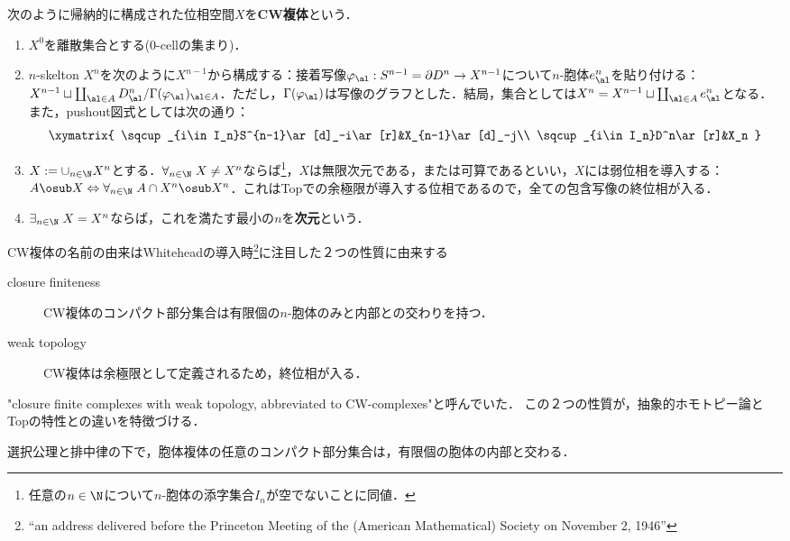 \documentclass[uplatex, dvipdfmx]{jsreport}
\begin{document}
\begin{definition}
    次のように帰納的に構成された位相空間$X$を\textbf{CW複体}という．
    \begin{enumerate}
        \item $X^0$を離散集合とする($0$-cellの集まり)．
        \item $n$-skelton $X^n$を次のように$X^{n-1}$から構成する：接着写像$\varphi_\al:S^{n-1}=\partial D^n\to X^{n-1}$について$n$-胞体$e^n_\al$を貼り付ける：$X^{n-1}\sqcup\coprod_{\al\in A}D^n_\al/\Gamma(\varphi_\al)_{\al\in A}$．ただし，$\Gamma(\varphi_\al)$は写像のグラフとした．結局，集合としては$X^{n}=X^{n-1}\sqcup\coprod_{\al\in A}e^n_\al$となる．
        また，pushout図式としては次の通り：
        \[\xymatrix{
        \sqcup_{i\in I_n}S^{n-1}\ar[d]_-i\ar[r]&X_{n-1}\ar[d]_-j\\
        \sqcup_{i\in I_n}D^n\ar[r]&X_n
        }\]
        \item $X:=\cup_{n\in\N}X^n$とする．$\forall_{n\in\N}\;X\ne X^n$ならば\footnote{任意の$n\in\N$について$n$-胞体の添字集合$I_n$が空でないことに同値．}，$X$は無限次元である，または可算であるといい，$X$には弱位相を導入する：$A\osub X\Leftrightarrow\forall_{n\in\N}\;A\cap X^n\osub X^n$．これはTopでの余極限が導入する位相であるので，全ての包含写像の終位相が入る．
        \item $\exists_{n\in\N}\;X=X^n$ならば，これを満たす最小の$n$を\textbf{次元}という．
    \end{enumerate}
\end{definition}
\begin{history}
    CW複体の名前の由来はWhiteheadの導入時\footnote{“an address delivered before the Princeton Meeting of the (American Mathematical) Society on November 2, 1946”}に注目した２つの性質に由来する
    \begin{description}
        \item[closure finiteness] CW複体のコンパクト部分集合は有限個の$n$-胞体のみと内部との交わりを持つ．
        \item[weak topology] CW複体は余極限として定義されるため，終位相が入る．
    \end{description}
    "closure finite complexes with weak topology, abbreviated to CW-complexes"と呼んでいた．
    この２つの性質が，抽象的ホモトピー論とTopの特性との違いを特徴づける．
\end{history}

\begin{lemma}
    選択公理と排中律の下で，胞体複体の任意のコンパクト部分集合は，有限個の胞体の内部と交わる．
\end{lemma}
\end{document}
